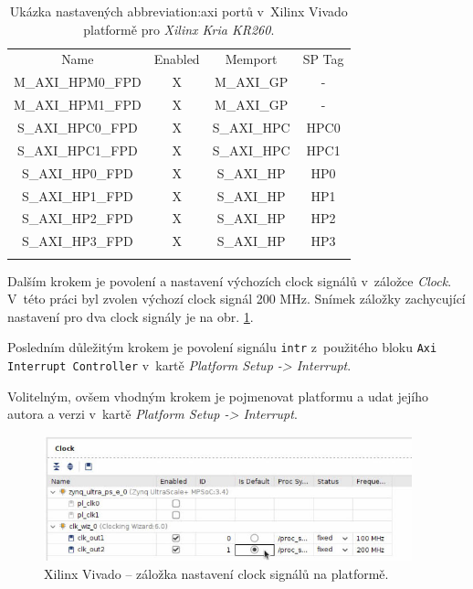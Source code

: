 \documentclass[a4paper, twoside, 11pt]{article}
\begin{document}
				\begin{table}[H]
					\centering
					\caption{Ukázka nastavených \gls{abbreviation:axi} portů v~Xilinx Vivado platformě pro \textit{Xilinx Kria KR260}.}
				  \vspace*{0.15cm}
				
					\begin{tabular}{!{\vrule width 2pt} c | c | c | c !{\vrule width 2pt}}
					Name & Enabled & Memport & SP Tag\\
					M\_AXI\_HPM0\_FPD & X & M\_AXI\_GP & -\\ \hline
					M\_AXI\_HPM1\_FPD & X & M\_AXI\_GP & -\\ \hline
					S\_AXI\_HPC0\_FPD & X & S\_AXI\_HPC & HPC0\\ \hline
					S\_AXI\_HPC1\_FPD & X & S\_AXI\_HPC & HPC1\\ \hline
					S\_AXI\_HP0\_FPD & X & S\_AXI\_HP & HP0\\ \hline
					S\_AXI\_HP1\_FPD & X & S\_AXI\_HP & HP1\\ \hline
					S\_AXI\_HP2\_FPD & X & S\_AXI\_HP & HP2\\ \hline
					S\_AXI\_HP3\_FPD & X & S\_AXI\_HP & HP3\\ 
					\end{tabular}
					\label{tab:vivado-platform-setup-axi-xilinx-kria}
				\end{table}

				Dalším krokem je povolení a nastavení výchozích clock signálů v~záložce \textit{Clock}. V~této práci byl zvolen výchozí clock signál 200 MHz. Snímek záložky zachycující nastavení pro dva clock signály je na obr. \ref{fig:kr26-xilix-vivado-flow-14}.\par
				Posledním důležitým krokem je povolení signálu \texttt{intr} z~použitého bloku \texttt{Axi Interrupt Controller} v~kartě \textit{Platform Setup -> Interrupt}.\par
				Volitelným, ovšem vhodným krokem je pojmenovat platformu a udat jejího autora a verzi v~kartě \textit{Platform Setup -> Interrupt}.

				\begin{figure}[htbp!]
					\centering
					\includegraphics[width=0.95\textwidth]{src/png/kr26-xilinx-vivado-flow/kr26-xilix-vivado-flow-14.jpg}
					\caption{Xilinx Vivado – záložka nastavení clock signálů na platformě.}
					\label{fig:kr26-xilix-vivado-flow-14}
				\end{figure}
\end{document}
